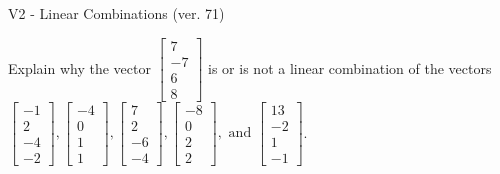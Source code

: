 \begin{exercise}
  \begin{exerciseTitle}V2 - Linear Combinations (ver. 71)\end{exerciseTitle}
  \begin{exerciseStatement}
    Explain why the vector \(\left[\begin{array}{c}
7 \\
-7 \\
6 \\
8
\end{array}\right]\)  is or is not a linear 
	combination of the vectors \(\left[\begin{array}{c}
-1 \\
2 \\
-4 \\
-2
\end{array}\right] , \left[\begin{array}{c}
-4 \\
0 \\
1 \\
1
\end{array}\right] , \left[\begin{array}{c}
7 \\
2 \\
-6 \\
-4
\end{array}\right] , \left[\begin{array}{c}
-8 \\
0 \\
2 \\
2
\end{array}\right] , \text{ and } \left[\begin{array}{c}
13 \\
-2 \\
1 \\
-1
\end{array}\right]\).
	



\end{exerciseStatement}
\end{exercise}
